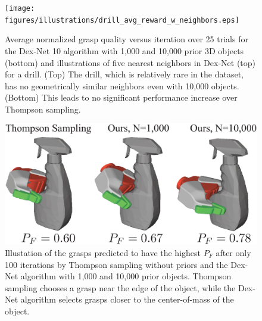 \begin{figure}[t!]
\centering
\texttt{[image: figures/illustrations/drill\_avg\_reward\_w\_neighbors.eps]}
\caption{Average normalized grasp quality versus iteration over 25 trials for the Dex-Net 10 algorithm with 1,000 and 10,000 prior 3D objects (bottom) and illustrations of five nearest neighbors in Dex-Net (top) for a drill. (Top) The drill, which is relatively rare in the dataset, has no geometrically similar neighbors even with 10,000 objects. (Bottom) This leads to no significant performance increase over Thompson sampling.}
\vspace*{-10pt}
\end{figure}

\begin{figure}[t!]
\centering
\includegraphics[scale=0.28]{figures/illustrations/spray_grasps.eps}
\caption{Illustation of the grasps predicted to have the highest $P_F$ after only 100 iterations by Thompson sampling without priors and the Dex-Net algorithm with 1,000 and 10,000 prior objects. Thompson sampling chooses a grasp near the edge of the object, while the Dex-Net algorithm selects grasps closer to the center-of-mass of the object.}
\vspace*{-5pt}
\end{figure}

